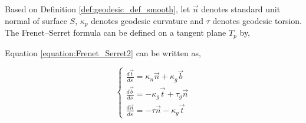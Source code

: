 Based on Definition \ref{def:geodesic_def_smooth}, let $\vec{n}$ denotes standard unit normal of surface $S$, $\kappa_{p}$ denotes geodesic curvature and $\tau$ denotes geodesic torsion. The Frenet--Serret formula can be defined on a tangent plane $T_{p}$ by,


Equation \ref{equation:Frenet_Serret2} can be written as,

\begin{equation}
\left\{\begin{matrix}
\frac{d\vec{t}}{ds}  = \kappa_n \vec{n} + \kappa_{g} \vec{b}\\ 
\frac{d\vec{b}}{ds} = -\kappa_{g} \vec{t} + \tau_{g} \vec{n}\\ 
\frac{d\vec{n}}{ds} = -\tau \vec{n} - \kappa_{g}\vec{t}
\end{matrix}\right.
\label{equation:Frenet_Serret_geo_cur}
\end{equation}

